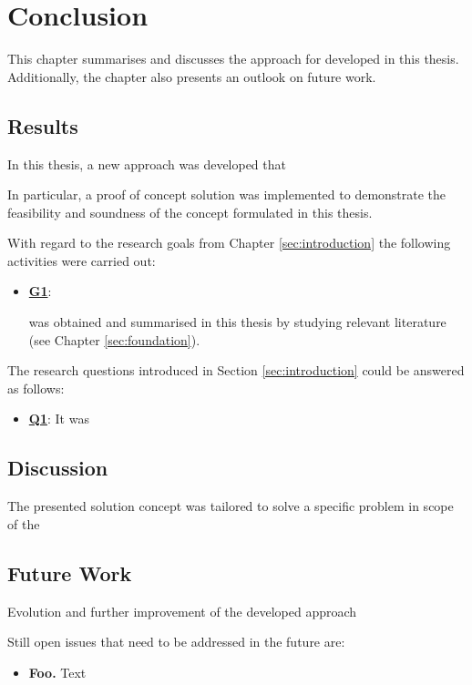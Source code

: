 \section{Conclusion\label{sec:conclusion}}

This chapter summarises and discusses the  approach for developed in this thesis. Additionally, the chapter also presents an outlook on future work.

\subsection{Results}

In this thesis, a new approach was developed that 

In particular, a
proof of concept solution was implemented to demonstrate the feasibility and soundness of the
concept formulated in this thesis.

With regard to the research goals from Chapter \ref{sec:introduction} the following activities
were carried out:

\begin{itemize}
    \item \hyperref[G1]{\textbf{G1}}: 
    
    was obtained and summarised in this
      thesis by studying relevant literature (see Chapter \ref{sec:foundation}).


\end{itemize}

\clearpage
The research questions introduced in Section \ref{sec:introduction} could be answered as follows:

\begin{itemize}

  \item \hyperref[Q1]{\textbf{Q1}}: It was 

\end{itemize}

\subsection{Discussion}

The presented solution concept was tailored to solve a specific problem in scope of the 

\subsection{Future Work}

Evolution and further improvement of the developed approach 

Still open issues that need to be addressed in the future are:
\begin{itemize}
    \item \textbf{Foo.} Text
\end{itemize}

